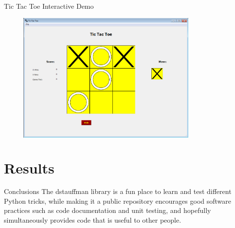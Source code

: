\documentclass{beamer}
\begin{document}
\begin{frame}{Tic Tac Toe}
    Interactive Demo
    \begin{figure}
        \centering
        \includegraphics[width=0.8\textwidth]{TicTacToeBoard.png}
    \end{figure}
\end{frame}

\section{Results}
\begin{frame}{Conclusions}
    The dstauffman library is a fun place to learn and test different Python tricks, while making it a public repository encourages good software practices such as code documentation and unit testing, and hopefully simultaneously provides code that is useful to other people.
\end{frame}
\end{document}
